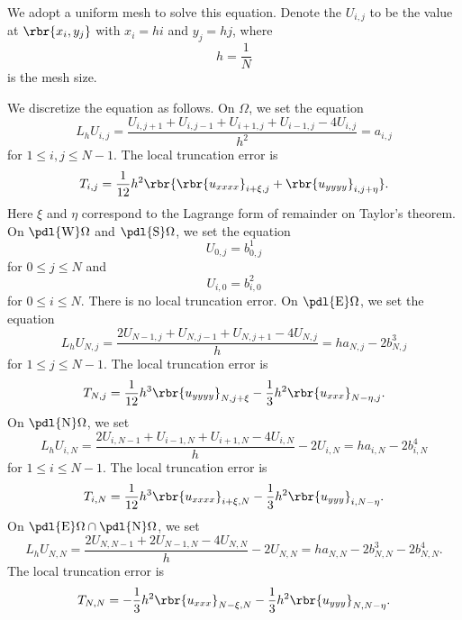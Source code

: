 \documentclass[english, nochinese]{pnote}
\begin{document}
We adopt a uniform mesh to solve this equation. Denote the $ U_{ i, j } $ to be the value at $ \rbr{ x_i, y_j } $ with $ x_i = h i $ and $ y_j = h j $, where
\begin{equation}
h = \frac{1}{N}
\end{equation}
is the mesh size.

We discretize the equation as follows. On $\Omega$, we set the equation
\begin{equation}
L_h U_{ i, j } = \frac{ U_{ i, j + 1 } + U_{ i, j - 1 } + U_{ i + 1, j } + U_{ i - 1, j } - 4 U_{ i, j } }{h^2} = a_{ i, j }
\end{equation}
for $ 1 \le i, j \le N - 1 $. The local truncation error is
\begin{equation}
T_{ i, j } = \frac{1}{12} h^2 \rbr{ \rbr{u_{ x x x x }}_{ i + \xi, j } + \rbr{u_{ y y y y }}_{ i, j + \eta } }.
\end{equation}
Here $\xi$ and $\eta$ correspond to the Lagrange form of remainder on Taylor's theorem.
On $ \pdl{\text{W}} \Omega $ and $ \pdl{\text{S}} \Omega $, we set the equation
\begin{equation}
U_{ 0, j } = b^1_{ 0, j }
\end{equation}
for $ 0 \le j \le N $ and
\begin{equation}
U_{ i, 0 } = b^2_{ i, 0 }
\end{equation}
for $ 0 \le i \le N $. There is no local truncation error. On $ \pdl{\text{E}} \Omega $, we set the equation
\begin{equation}
L_h U_{ N, j } = \frac{ 2 U_{ N - 1, j } + U_{ N, j - 1 } + U_{ N, j + 1 } - 4 U_{ N, j } }{h} = h a_{ N, j } - 2 b^3_{ N, j }
\end{equation}
for $ 1 \le j \le N - 1 $.
The local truncation error is
\begin{equation}
T_{ N, j } = \frac{1}{12} h^3 \rbr{u_{ y y y y }}_{ N, j + \xi } - \frac{1}{3} h^2 \rbr{u_{ x x x }}_{ N - \eta, j }.
\end{equation}
On $ \pdl{\text{N}} \Omega $, we set
\begin{equation}
L_h U_{ i, N } = \frac{ 2 U_{ i, N - 1 } + U_{ i - 1, N } + U_{ i + 1, N } - 4 U_{ i, N } }{h} - 2 U_{ i, N } = h a_{ i, N } - 2 b^4_{ i, N }
\end{equation}
for $ 1 \le i \le N - 1 $.
The local truncation error is
\begin{equation}
T_{ i, N } = \frac{1}{12} h^3 \rbr{u_{ x x x x }}_{ i + \xi, N } - \frac{1}{3} h^2 \rbr{u_{ y y y }}_{ i, N - \eta }.
\end{equation}
On $ \pdl{\text{E}} \Omega \cap \pdl{\text{N}} \Omega $, we set
\begin{equation}
L_h U_{ N, N } = \frac{ 2 U_{ N, N - 1 } + 2 U_{ N - 1, N } - 4 U_{ N, N } }{h} - 2 U_{ N, N } = h a_{ N, N } - 2 b^3_{ N, N } - 2 b^4_{ N, N }.
\end{equation}
The local truncation error is
\begin{equation}
T_{ N, N } = - \frac{1}{3} h^2 \rbr{u_{ x x x }}_{ N - \xi, N } - \frac{1}{3} h^2 \rbr{u_{ y y y }}_{ N, N - \eta }.
\end{equation}
\end{document}
